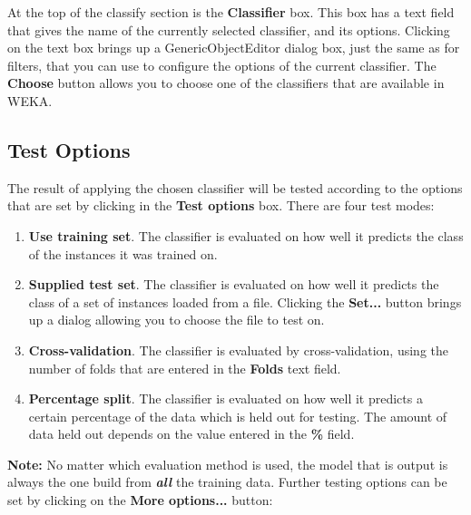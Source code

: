 \documentclass[a4paper]{article}
\begin{document}
\label{sec:classifier}
At the top of the classify section is the \textbf{Classifier}
box. This box has a text field that gives the name of the currently
selected classifier, and its options. Clicking on the text box brings
up a GenericObjectEditor dialog box, just the same as for filters,
that you can use to configure the options of the current classifier.
The \textbf{Choose} button allows you to choose one of the classifiers
that are available in WEKA.

\subsection{Test Options}

The result of applying the chosen classifier will be tested according to the
options that are set by clicking in the \textbf{Test options} box.  There are
four test modes:

\begin{enumerate}
\item \textbf{Use training set}.
The classifier is evaluated on how well it predicts the class of the instances
it was trained on. 
\item \textbf{Supplied test set}.
The classifier is evaluated on how well it predicts the class of a set of
instances loaded from a file. Clicking the \textbf{Set...} button brings up a
dialog allowing you to choose the file to test on.
\item \textbf{Cross-validation}.
The classifier is evaluated by cross-validation, using the number of folds that
are entered in the \textbf{Folds} text field. 
\item \textbf{Percentage split}.
The classifier is evaluated on how well it predicts a certain percentage of the
data which is held out for testing. The amount of data held out depends on the
value entered in the \textbf{\%} field.
\end{enumerate}
\noindent
\textbf{Note:} No matter which evaluation method is used, the model
that is output is always the one build from \textbf{\em all} the training data.
\noindent
Further testing options can be set by clicking on the \textbf{More options...}
button:
\end{document}
